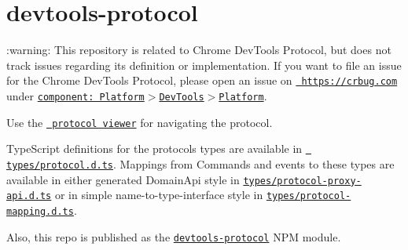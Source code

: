 \chapter{devtools-\/protocol}
\hypertarget{md__c_1_2_users_2_s_t_r_i_d_e_r_2source_2repos_2_internal_a_p_i_2_internal_a_p_i_2wwwroot_2lib_22cb2d406dbdc4450bd364706a817212f}{}\label{md__c_1_2_users_2_s_t_r_i_d_e_r_2source_2repos_2_internal_a_p_i_2_internal_a_p_i_2wwwroot_2lib_22cb2d406dbdc4450bd364706a817212f}
\label{md__c_1_2_users_2_s_t_r_i_d_e_r_2source_2repos_2_internal_a_p_i_2_internal_a_p_i_2wwwroot_2lib_22cb2d406dbdc4450bd364706a817212f_autotoc_md7835}%
%
 \+:warning\+: This repository is related to Chrome Dev\+Tools Protocol, but does not track issues regarding its definition or implementation. If you want to file an issue for the Chrome Dev\+Tools Protocol, please open an issue on \href{https://crbug.com}{\texttt{ https\+://crbug.\+com}} under \href{https://bugs.chromium.org/p/chromium/issues/entry?components=Platform\%3EDevTools\%3EPlatform}{\texttt{ {\ttfamily component\+: Platform\texorpdfstring{$>$}{>}Dev\+Tools\texorpdfstring{$>$}{>}Platform}}}.

Use the \href{https://chromedevtools.github.io/devtools-protocol/}{\texttt{ protocol viewer}} for navigating the protocol.

Type\+Script definitions for the protocol\textquotesingle{}s types are available in \href{https://github.com/ChromeDevTools/devtools-protocol/tree/master/types}{\texttt{ \textquotesingle{}types/protocol.\+d.\+ts\textquotesingle{}}}. Mappings from Commands and events to these types are available in either generated {\ttfamily Domain\+Api} style in \href{https://github.com/ChromeDevTools/devtools-protocol/blob/master/types/protocol-proxy-api.d.ts}{\texttt{ {\ttfamily types/protocol-\/proxy-\/api.\+d.\+ts}}} or in simple name-\/to-\/type-\/interface style in \href{https://github.com/ChromeDevTools/devtools-protocol/blob/master/types/protocol-mapping.d.ts}{\texttt{ {\ttfamily types/protocol-\/mapping.\+d.\+ts}}}.

Also, this repo is published as the \href{https://www.npmjs.com/package/devtools-protocol}{\texttt{ {\ttfamily devtools-\/protocol}}} NPM module.  